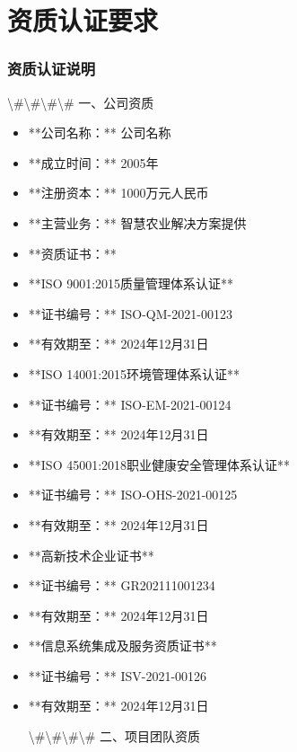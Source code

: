 \documentclass[UTF8,a4paper,zihao=-4]{ctexart}
\begin{document}
\section{资质认证要求}

\subsubsection{资质认证说明}

\textbackslash{}#\textbackslash{}#\textbackslash{}#\textbackslash{}# 一、公司资质

\begin{itemize}
\item **公司名称：** {{公司名称}}
\item **成立时间：** 2005年
\item **注册资本：** 1000万元人民币
\item **主营业务：** 智慧农业解决方案提供
\item **资质证书：**
\item **ISO 9001:2015质量管理体系认证**
\item **证书编号：** ISO-QM-2021-00123
\item **有效期至：** 2024年12月31日
\item **ISO 14001:2015环境管理体系认证**
\item **证书编号：** ISO-EM-2021-00124
\item **有效期至：** 2024年12月31日
\item **ISO 45001:2018职业健康安全管理体系认证**
\item **证书编号：** ISO-OHS-2021-00125
\item **有效期至：** 2024年12月31日
\item **高新技术企业证书**
\item **证书编号：** GR202111001234
\item **有效期至：** 2024年12月31日
\item **信息系统集成及服务资质证书**
\item **证书编号：** ISV-2021-00126
\item **有效期至：** 2024年12月31日

\textbackslash{}#\textbackslash{}#\textbackslash{}#\textbackslash{}# 二、项目团队资质


\end{itemize}
\end{document}
